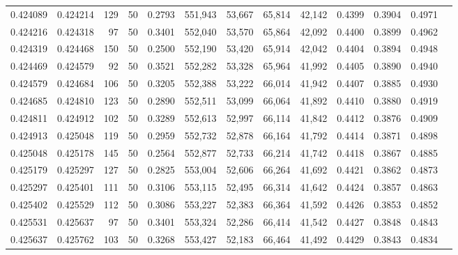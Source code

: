 \begin{tabular}{rrrrrrrrrrrrr}
0.424089 & 0.424214 &   129 &  50 &                                     0.2793 & 551,943 &  53,667 &  65,814 &  42,142 & 0.4399 & 0.3904 & 0.4971 \\
0.424216 & 0.424318 &    97 &  50 &                                     0.3401 & 552,040 &  53,570 &  65,864 &  42,092 & 0.4400 & 0.3899 & 0.4962 \\
0.424319 & 0.424468 &   150 &  50 &                                     0.2500 & 552,190 &  53,420 &  65,914 &  42,042 & 0.4404 & 0.3894 & 0.4948 \\
0.424469 & 0.424579 &    92 &  50 &                                     0.3521 & 552,282 &  53,328 &  65,964 &  41,992 & 0.4405 & 0.3890 & 0.4940 \\
0.424579 & 0.424684 &   106 &  50 &                                     0.3205 & 552,388 &  53,222 &  66,014 &  41,942 & 0.4407 & 0.3885 & 0.4930 \\
0.424685 & 0.424810 &   123 &  50 &                                     0.2890 & 552,511 &  53,099 &  66,064 &  41,892 & 0.4410 & 0.3880 & 0.4919 \\
0.424811 & 0.424912 &   102 &  50 &                                     0.3289 & 552,613 &  52,997 &  66,114 &  41,842 & 0.4412 & 0.3876 & 0.4909 \\
0.424913 & 0.425048 &   119 &  50 &                                     0.2959 & 552,732 &  52,878 &  66,164 &  41,792 & 0.4414 & 0.3871 & 0.4898 \\
0.425048 & 0.425178 &   145 &  50 &                                     0.2564 & 552,877 &  52,733 &  66,214 &  41,742 & 0.4418 & 0.3867 & 0.4885 \\
0.425179 & 0.425297 &   127 &  50 &                                     0.2825 & 553,004 &  52,606 &  66,264 &  41,692 & 0.4421 & 0.3862 & 0.4873 \\
0.425297 & 0.425401 &   111 &  50 &                                     0.3106 & 553,115 &  52,495 &  66,314 &  41,642 & 0.4424 & 0.3857 & 0.4863 \\
0.425402 & 0.425529 &   112 &  50 &                                     0.3086 & 553,227 &  52,383 &  66,364 &  41,592 & 0.4426 & 0.3853 & 0.4852 \\
0.425531 & 0.425637 &    97 &  50 &                                     0.3401 & 553,324 &  52,286 &  66,414 &  41,542 & 0.4427 & 0.3848 & 0.4843 \\
0.425637 & 0.425762 &   103 &  50 &                                     0.3268 & 553,427 &  52,183 &  66,464 &  41,492 & 0.4429 & 0.3843 & 0.4834 \\

\end{tabular}
